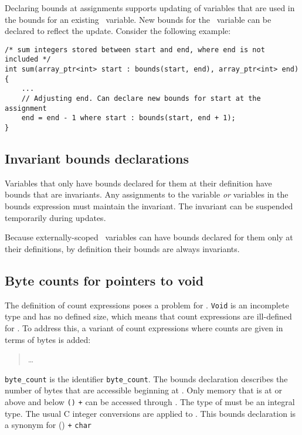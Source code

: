 Declaring bounds at assignments supports updating of variables that are
used in the bounds for an existing \arrayptr\ variable. New
bounds for the \arrayptr\ variable can be declared to reflect
the update. Consider the following example:

\begin{lstlisting}
/* sum integers stored between start and end, where end is not included */
int sum(array_ptr<int> start : bounds(start, end), array_ptr<int> end)
{ 
    ...
    // Adjusting end. Can declare new bounds for start at the assignment
    end = end - 1 where start : bounds(start, end + 1);
}
\end{lstlisting}


\subsection{Invariant bounds declarations}
\label{section:invariant-bounds-declarations}

Variables that only have bounds declared for them at their definition
have bounds that are invariants. Any assignments to the variable
\emph{or} variables in the bounds expression must maintain the
invariant. The invariant can be suspended temporarily during updates.

Because externally-scoped \arrayptr\ variables can have bounds declared
for them only at their definitions, by definition their bounds are
always invariants.

\subsection{Byte counts for pointers to void}
\label{section:pointers-to-void}

The definition of count expressions poses a problem for
\arrayptrvoid. \texttt{Void} is an
incomplete type and has no defined size, which means that count
expressions are ill-defined for
\arrayptrvoid. To address this, a
variant of count expressions where counts are given in terms of bytes is
added:


\begin{quote}
\ldots{}

\end{quote}

\texttt{byte\_count} is the identifier \texttt{byte\_count}.
The bounds declaration 
describes the number of bytes that are accessible beginning at . 
Only memory that is at or above  and below \texttt{(\arrayptrchar)}
 \texttt{+}  can be accessed through . The type
of  must be an integral type.  The usual C integer conversions are
applied to .  This bounds declaration is a synonym for 
           {
                      {(\arrayptrchar)  \texttt{+} }
                      {\texttt{char}}}

